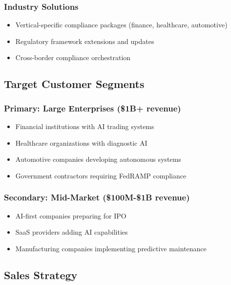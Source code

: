 \documentclass[12pt,a4paper]{article}
\begin{document}
\subsubsection{Industry Solutions}
\begin{itemize}
    \item Vertical-specific compliance packages (finance, healthcare, automotive)
    \item Regulatory framework extensions and updates
    \item Cross-border compliance orchestration
\end{itemize}

\subsection{Target Customer Segments}

\subsubsection{Primary: Large Enterprises (\$1B+ revenue)}
\begin{itemize}
    \item Financial institutions with AI trading systems
    \item Healthcare organizations with diagnostic AI
    \item Automotive companies developing autonomous systems
    \item Government contractors requiring FedRAMP compliance
\end{itemize}

\subsubsection{Secondary: Mid-Market (\$100M-\$1B revenue)}
\begin{itemize}
    \item AI-first companies preparing for IPO
    \item SaaS providers adding AI capabilities
    \item Manufacturing companies implementing predictive maintenance
\end{itemize}

\subsection{Sales Strategy}

\begin{center}
\end{center}
\end{document}
